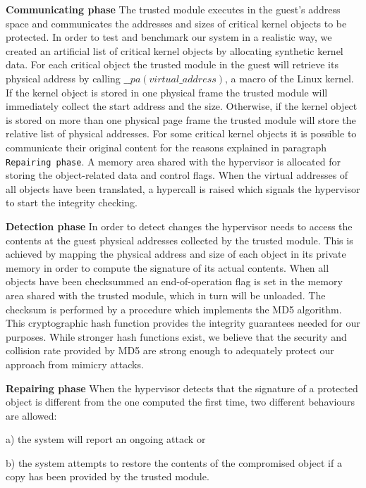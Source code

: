 \textbf{Communicating phase}
The trusted module executes in the guest's address space and communicates the addresses and sizes of critical kernel objects to be protected. 
In order to test and benchmark our system in a realistic way, we created an artificial list of critical kernel objects by allocating synthetic kernel data.
For each critical object the trusted module in the guest will retrieve its physical address by calling $\_\_pa(virtual\_address)$, a macro of the Linux kernel. 
If the kernel object is stored in one physical frame the trusted module will immediately collect the start address and the size. Otherwise, if the kernel object is stored on more than one physical page 
frame the trusted module will store the relative list of physical addresses. 
For some critical kernel objects it is possible to communicate their original content for the reasons explained in paragraph \texttt{Repairing phase}. 
A memory area shared with the hypervisor is allocated for storing the object-related data and control flags. 
When the virtual addresses of all objects have been translated, a hypercall is raised which signals the hypervisor to start the integrity checking.

\textbf{Detection phase}
In order to detect changes the hypervisor needs to access the contents at the guest physical addresses collected by the trusted module. This is achieved by mapping the physical address and size of each object in its private memory in order to compute the signature of its actual contents. When all objects have been checksummed an end-of-operation flag is set in the memory area shared with the trusted module, which in turn will be unloaded. 
The checksum is performed by a procedure which implements the MD5 algorithm\cite{md5rfc}. This cryptographic hash function provides the integrity guarantees needed for our purposes. While stronger hash functions exist, we believe that the security and collision rate provided by MD5 are strong enough to adequately protect our approach from mimicry attacks. 

\textbf{Repairing phase}
When the hypervisor detects that the signature of a protected object is different from the one computed the first time, two different behaviours are allowed: 

a) the system will report an ongoing attack or 

b) the system attempts to restore the contents of the compromised object if a copy has been provided by the trusted module. 

